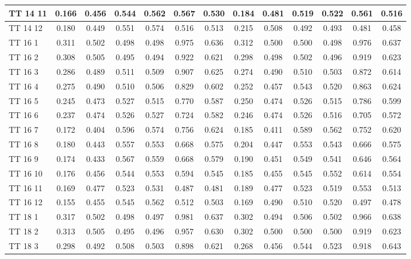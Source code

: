\documentclass{article}
\begin{document}
\begin{tabular}{|l|c|c|c|c|c|c||c|c|c|c|c|c|}
TT 14 11 & 0.166 & 0.456 & 0.544 & 0.562 & 0.567 & 0.530 & 0.184 & 0.481 & 0.519 & 0.522 & 0.561 & 0.516\\ \hline
TT 14 12 & 0.180 & 0.449 & 0.551 & 0.574 & 0.516 & 0.513 & 0.215 & 0.508 & 0.492 & 0.493 & 0.481 & 0.458\\ \hline
TT 16  1 & 0.311 & 0.502 & 0.498 & 0.498 & 0.975 & 0.636 & 0.312 & 0.500 & 0.500 & 0.498 & 0.976 & 0.637\\ \hline
TT 16  2 & 0.308 & 0.505 & 0.495 & 0.494 & 0.922 & 0.621 & 0.298 & 0.498 & 0.502 & 0.496 & 0.919 & 0.623\\ \hline
TT 16  3 & 0.286 & 0.489 & 0.511 & 0.509 & 0.907 & 0.625 & 0.274 & 0.490 & 0.510 & 0.503 & 0.872 & 0.614\\ \hline
TT 16  4 & 0.275 & 0.490 & 0.510 & 0.506 & 0.829 & 0.602 & 0.252 & 0.457 & 0.543 & 0.520 & 0.863 & 0.624\\ \hline
TT 16  5 & 0.245 & 0.473 & 0.527 & 0.515 & 0.770 & 0.587 & 0.250 & 0.474 & 0.526 & 0.515 & 0.786 & 0.599\\ \hline
TT 16  6 & 0.237 & 0.474 & 0.526 & 0.527 & 0.724 & 0.582 & 0.246 & 0.474 & 0.526 & 0.516 & 0.705 & 0.572\\ \hline
TT 16  7 & 0.172 & 0.404 & 0.596 & 0.574 & 0.756 & 0.624 & 0.185 & 0.411 & 0.589 & 0.562 & 0.752 & 0.620\\ \hline
TT 16  8 & 0.180 & 0.443 & 0.557 & 0.553 & 0.668 & 0.575 & 0.204 & 0.447 & 0.553 & 0.543 & 0.666 & 0.575\\ \hline
TT 16  9 & 0.174 & 0.433 & 0.567 & 0.559 & 0.668 & 0.579 & 0.190 & 0.451 & 0.549 & 0.541 & 0.646 & 0.564\\ \hline
TT 16 10 & 0.176 & 0.456 & 0.544 & 0.553 & 0.594 & 0.545 & 0.185 & 0.455 & 0.545 & 0.552 & 0.614 & 0.554\\ \hline
TT 16 11 & 0.169 & 0.477 & 0.523 & 0.531 & 0.487 & 0.481 & 0.189 & 0.477 & 0.523 & 0.519 & 0.553 & 0.513\\ \hline
TT 16 12 & 0.155 & 0.455 & 0.545 & 0.562 & 0.512 & 0.503 & 0.169 & 0.490 & 0.510 & 0.520 & 0.497 & 0.478\\ \hline
TT 18  1 & 0.317 & 0.502 & 0.498 & 0.497 & 0.981 & 0.637 & 0.302 & 0.494 & 0.506 & 0.502 & 0.966 & 0.638\\ \hline
TT 18  2 & 0.313 & 0.505 & 0.495 & 0.496 & 0.957 & 0.630 & 0.302 & 0.500 & 0.500 & 0.500 & 0.919 & 0.623\\ \hline
TT 18  3 & 0.298 & 0.492 & 0.508 & 0.503 & 0.898 & 0.621 & 0.268 & 0.456 & 0.544 & 0.523 & 0.918 & 0.643\\ \hline

\end{tabular}
\end{document}
